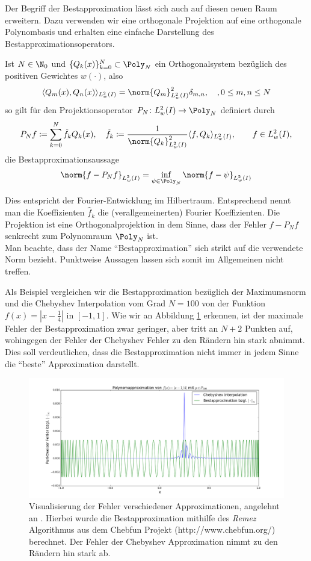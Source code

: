 Der Begriff der Bestapproximation lässt sich auch auf diesen neuen Raum erweitern. Dazu verwenden wir eine orthogonale Projektion auf eine orthogonale Polynombasis und erhalten eine einfache Darstellung des Bestapproximationsoperators.
\begin{maththeorem}
Ist $N\in\N_0$ und $\lbrace Q_k(x)\rbrace_{k=0}^N\subset \Poly_N$ ein Orthogonalsystem bezüglich des positiven Gewichtes $w(\cdot)$, also 
\[\langle Q_m(x),Q_n(x)\rangle_{L_w^2(I)}=\norm{Q_m}^2_{L_w^2(I)}\delta_{m,n},\quad, 0\le m,n\le N\]
so gilt für den Projektionsoperator $P_N\colon L_w^2(I)\to \Poly_N$ definiert durch 
\[P_Nf\coloneqq \sum_{k=0}^N\hat{f}_kQ_k(x),\quad \hat{f}_k\coloneqq \frac{1}{\norm{Q_k}_{L_w^2(I)}^2}\langle f,Q_k\rangle_{L_w^2(I)},\qquad f\in L^2_w(I),\]
die Bestapproximationsaussage
\[\norm{f-P_Nf}_{L_w^2(I)}=\inf\limits_{\psi\in\Poly_N}\norm{f-\psi}_{L_w^2(I)}\]
\end{maththeorem}
Dies entspricht der Fourier-Entwicklung im Hilbertraum. Entsprechend nennt man die Koeffizienten $\hat{f}_k$ die (verallgemeinerten) Fourier Koeffizienten. Die Projektion ist eine Orthogonalprojektion in dem Sinne, dass der Fehler $f-P_Nf$ senkrecht zum Polynomraum $\Poly_N$ ist.\\
Man beachte, dass der Name "`Bestapproximation"' sich strikt auf die verwendete Norm bezieht. Punktweise Aussagen lassen sich somit im Allgemeinen nicht treffen. 
\begin{mathbsp}
Als Beispiel vergleichen wir die Bestapproximation bezüglich der Maximumsnorm und die Chebyshev Interpolation vom Grad $N=100$ von der Funktion $f(x)=|x-\frac{1}{4}|$ in $[-1,1]$. Wie wir an Abbildung \ref{polyapproxcomp} erkennen, ist der maximale Fehler der Bestapproximation zwar geringer, aber tritt an $N+2$ Punkten auf, wohingegen der Fehler der Chebyshev Fehler zu den Rändern hin stark abnimmt. Dies soll verdeutlichen, dass die Bestapproximation nicht immer in jedem Sinne die "`beste"' Approximation darstellt.
\begin{figure}[ht]
 \center
 \includegraphics[width=\linewidth]{Figures/polynomial_approx_comparison.png}
 \caption{Visualisierung der Fehler verschiedener Approximationen, angelehnt an \autocite{Trefethen}. Hierbei wurde die Bestapproximation mithilfe des \emph{Remez} Algorithmus aus dem Chebfun Projekt (http://www.chebfun.org/) berechnet. Der Fehler der Chebyshev Approximation nimmt zu den Rändern hin stark ab.}
 \label{polyapproxcomp}
\end{figure}
\end{mathbsp}
